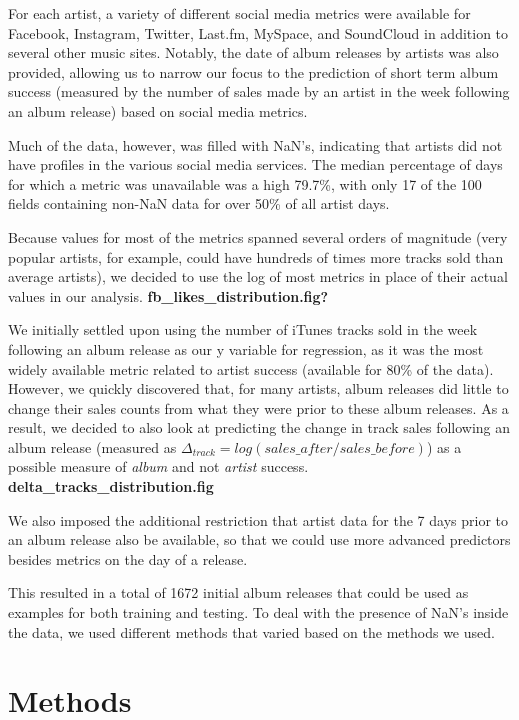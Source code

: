 \documentclass[conference]{IEEEtran}
\begin{document}
For each artist, a variety of different social media metrics were available for Facebook, Instagram, Twitter, Last.fm, MySpace, and SoundCloud in addition to several other music sites. Notably, the date of album releases by artists was also provided, allowing us to narrow our focus to the prediction of short term album success (measured by the number of sales made by an artist in the week following an album release) based on social media metrics.

Much of the data, however, was filled with NaN's, indicating that artists did not have profiles in the various social media services. The median percentage of days for which a metric was unavailable was a high 79.7\%, with only 17 of the 100 fields containing non-NaN data for over 50\% of all artist days.

Because values for most of the metrics spanned several orders of magnitude (very popular artists, for example, could have hundreds of times more tracks sold than average artists), we decided to use the log of most metrics in place of their actual values in our analysis. \textbf{fb\_likes\_distribution.fig?}

We initially settled upon using the number of iTunes tracks sold in the week following an album release as our y variable for regression, as it was the most widely available metric related to artist success (available for 80\% of the data). However, we quickly discovered that, for many artists, album releases did little to change their sales counts from what they were prior to these album releases. As a result, we decided to also look at predicting the change in track sales following an album release (measured as $\Delta_{track} = log(sales\_after/sales\_before)$) as a possible measure of \textit{album} and not \textit{artist} success. \textbf{delta\_tracks\_distribution.fig}

We also imposed the additional restriction that artist data for the 7 days prior to an album release also be available, so that we could use more advanced predictors besides metrics on the day of a release.

This resulted in a total of 1672 initial album releases that could be used as examples for both training and testing. To deal with the presence of NaN's inside the data, we used different methods that varied based on the methods we used.

\section{Methods}
\end{document}
